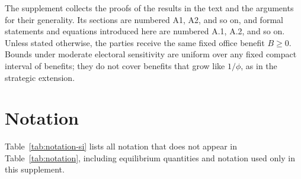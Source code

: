 \documentclass[12pt,letterpaper]{article}
\begin{document}
The supplement collects the proofs of the results in the text and the arguments for their generality. Its sections are numbered A1, A2, and so on, and formal statements and equations introduced here are numbered A.1, A.2, and so on. Unless stated otherwise, the parties receive the same fixed office benefit $B\ge0$. Bounds under moderate electoral sensitivity are uniform over any fixed compact interval of benefits; they do not cover benefits that grow like $1/\phi$, as in the strategic extension.

\section{Notation}\label{app:notation}
Table~\ref{tab:notation-si} lists all notation that does not appear in Table~\ref{tab:notation}, including equilibrium quantities and notation used only in this supplement.
\end{document}
